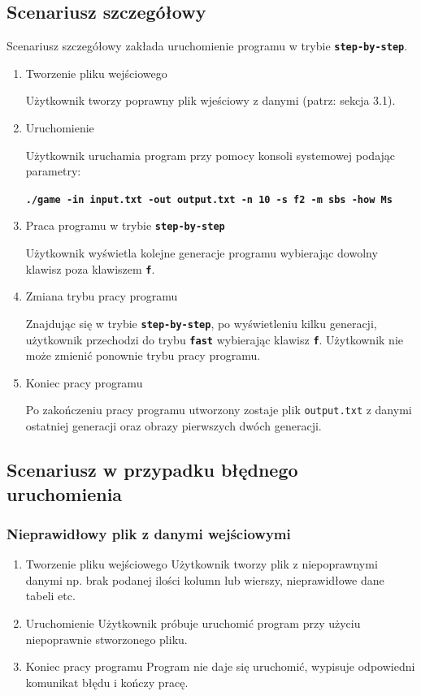\documentclass[a4paper]{article}
\begin{document}
\subsection{Scenariusz szczeg\'o\l{}owy}
\quad Scenariusz szczeg\'o\l{}owy zak\l{}ada uruchomienie programu w trybie \texttt{\textbf{step-by-step}}.
\begin{enumerate}
	\item Tworzenie pliku wej\'sciowego	

		U\.zytkownik tworzy poprawny plik wje\'sciowy z danymi (patrz: sekcja 3.1).
	\item Uruchomienie
	
		U\.zytkownik uruchamia program przy pomocy konsoli systemowej podaj\k{a}c parametry:

        \begin{center}
                \texttt{\textbf{./game -in input.txt -out output.txt -n 10 -s f2 -m sbs -how Ms}}
        \end{center}
	\item Praca programu w trybie \texttt{\textbf{step-by-step}}

		U\.zytkownik wy\'swietla kolejne generacje programu wybieraj\k{a}c dowolny klawisz poza klawiszem \texttt{\textbf{f}}.
	\item Zmiana trybu pracy programu
	
		Znajduj\k{a}c si\k{e} w trybie \texttt{\textbf{step-by-step}}, po wy\'swietleniu kilku generacji, u\.zytkownik przechodzi do trybu \texttt{\textbf{fast}} wybieraj\k{a}c klawisz \texttt{\textbf{f}}. U\.zytkownik nie mo\.ze zmieni\'c ponownie trybu pracy programu. 
	\item Koniec pracy programu

        	Po zako\'nczeniu pracy programu utworzony zostaje plik \texttt{output.txt} z danymi ostatniej generacji oraz obrazy pierwszych dw\'och generacji.
\end{enumerate}

\subsection{Scenariusz w przypadku b\l{}\k{e}dnego uruchomienia}
\subsubsection{Nieprawid\l{}owy plik z danymi wej\'sciowymi}

\begin{enumerate}
	\item Tworzenie pliku wej\'sciowego
		U\.zytkownik tworzy plik z niepoprawnymi danymi np. brak podanej ilo\'sci kolumn lub wierszy, nieprawid\l{}owe dane tabeli etc. 
	\item Uruchomienie
		U\.zytkownik pr\'obuje uruchomi\'c program przy u\.zyciu niepoprawnie stworzonego pliku.
	\item Koniec pracy programu
		Program nie daje si\k{e} uruchomi\'c, wypisuje odpowiedni komunikat b\l{}\k{e}du i ko\'nczy prac\k{e}.
\end{enumerate}
\end{document}
